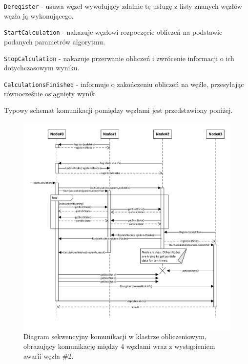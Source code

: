 \documentclass[12pt, twoside, openany, abstract=on]{report}
\theoremstyle{definition}
\begin{document}
\texttt{Deregister} - usuwa węzeł wywołujący zdalnie tę usługę z listy znanych węzłów węzła ją wykonującego.

\texttt{StartCalculation} - nakazuje węzłowi rozpoczęcie obliczeń na podstawie podanych parametrów algorytmu.

\texttt{StopCalculation} - nakazuje przerwanie obliczeń i zwrócenie informacji o ich dotychczasowym wyniku.

\texttt{CalculationsFinished} - informuje o zakończeniu obliczeń na węźle, przesyłając równocześnie osiągnięty wynik.

Typowy schemat komunikacji pomiędzy węzłami jest przedstawiony poniżej.

\begin{figure}[H]
    \centering
    \includegraphics[scale=0.8]{communicationDiagram.pdf} 
 \caption{Diagram sekwencyjny komunikacji w klastrze obliczeniowym, obrazujący komunikację między 4 węzłami wraz z wystąpieniem awarii węzła \#2.}
\end{figure}

\end{document}
